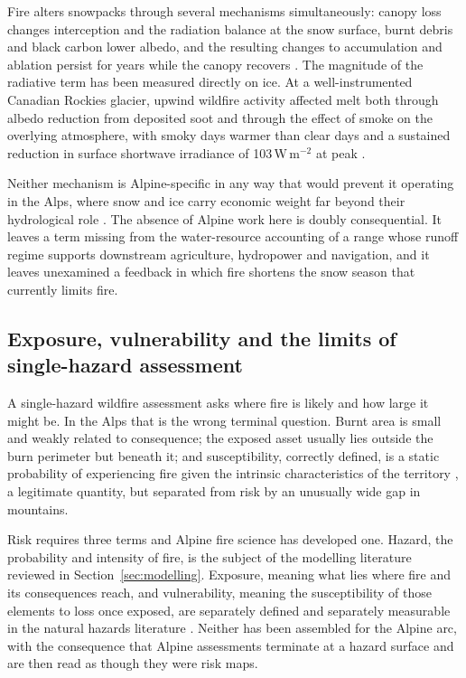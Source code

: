 \documentclass[11pt,a4paper]{article}
\begin{document}
Fire alters snowpacks through several mechanisms simultaneously: canopy loss changes interception and the radiation balance at the snow surface, burnt debris and black carbon lower albedo, and the resulting changes to accumulation and ablation persist for years while the canopy recovers \citep{koshkin_wildfire_2022}. The magnitude of the radiative term has been measured directly on ice. At a well-instrumented Canadian Rockies glacier, upwind wildfire activity affected melt both through albedo reduction from deposited soot and through the effect of smoke on the overlying atmosphere, with smoky days warmer than clear days and a sustained reduction in surface shortwave irradiance of 103\,W\,m$^{-2}$ at peak \citep{aubrywake_fire_2022}.

Neither mechanism is Alpine-specific in any way that would prevent it operating in the Alps, where snow and ice carry economic weight far beyond their hydrological role \citep{pede_mountain_2022}. The absence of Alpine work here is doubly consequential. It leaves a term missing from the water-resource accounting of a range whose runoff regime supports downstream agriculture, hydropower and navigation, and it leaves unexamined a feedback in which fire shortens the snow season that currently limits fire.

\subsection{Exposure, vulnerability and the limits of single-hazard assessment}

A single-hazard wildfire assessment asks where fire is likely and how large it might be. In the Alps that is the wrong terminal question. Burnt area is small and weakly related to consequence; the exposed asset usually lies outside the burn perimeter but beneath it; and susceptibility, correctly defined, is a static probability of experiencing fire given the intrinsic characteristics of the territory \citep{trucchia_defining_2022}, a legitimate quantity, but separated from risk by an unusually wide gap in mountains.

Risk requires three terms and Alpine fire science has developed one. Hazard, the probability and intensity of fire, is the subject of the modelling literature reviewed in Section~\ref{sec:modelling}. Exposure, meaning what lies where fire and its consequences reach, and vulnerability, meaning the susceptibility of those elements to loss once exposed, are separately defined and separately measurable in the natural hazards literature \citep{papathomakohle_towards_2025}. Neither has been assembled for the Alpine arc, with the consequence that Alpine assessments terminate at a hazard surface and are then read as though they were risk maps.
\end{document}
